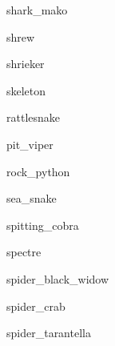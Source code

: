 \documentclass[letterpaper,serif]{module}
\begin{document}
\begin{newmonster}{shark_mako}\end{newmonster}

\begin{newmonster}{shrew}\end{newmonster}

\begin{newmonster}{shrieker}\end{newmonster}

\begin{newmonster}{skeleton}\end{newmonster}

\begin{newmonster}{rattlesnake}\end{newmonster}

\begin{newmonster}{pit_viper}\end{newmonster}

\begin{newmonster}{rock_python}\end{newmonster}

\begin{newmonster}{sea_snake}\end{newmonster}

\begin{newmonster}{spitting_cobra}\end{newmonster}

\begin{newmonster}{spectre}\end{newmonster}

\begin{newmonster}{spider_black_widow}\end{newmonster}

\begin{newmonster}{spider_crab}\end{newmonster}

\begin{newmonster}{spider_tarantella}\end{newmonster}
\end{document}
